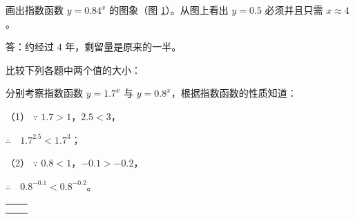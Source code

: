 画出指数函数 $y = 0.84^x$ 的图象（图 \ref{fig:1-29}）。从图上看出 $y = 0.5$ 必须并且只需 $x \approx 4$。

\begin{figure}[htbp]
    \centering
    
    \caption{}\label{fig:1-29}
\end{figure}

答：约经过 $4$ 年，剩留量是原来的一半。

\liti 比较下列各题中两个值的大小：

\begin{xiaoxiaotis}

    \hspace{1em}

\end{xiaoxiaotis}

\jie 分别考察指数函数 $y = 1.7^x$ 与 $y = 0.8^x$，根据指数函数的性质知道：

（1） $\because$ \quad $1.7 > 1$，$2.5 < 3$，

$\therefore \quad 1.7^{2.5} < 1.7^3$；

（2） $\because$ \quad $0.8 < 1$，$-0.1 > -0.2$，

$\therefore \quad 0.8^{-0.1} < 0.8^{-0.2}$。

\lianxi

\begin{xiaotis}

\begin{xiaoxiaotis}

    \vspace{0.5em}
    \vspace{0.5em}

\end{xiaoxiaotis}


\begin{xiaoxiaotis}

    \renewcommand\arraystretch{1.5}
    \begin{tabular}[t]{*{2}{@{}p{16em}}}
         &  \\
         & 
    \end{tabular}

\end{xiaoxiaotis}

\end{xiaotis}

